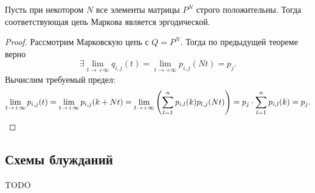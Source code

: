 \begin{corollary}
    Пусть при некотором $N$ все элементы матрицы $P^N$ строго положительны.
    Тогда соответствующая цепь Маркова является эргодической.
\end{corollary}
\begin{proof}
    Рассмотрим Марковскую цепь с $Q = P^N$. Тогда по предыдущей теореме верно
    \[
        \exists \lim_{t \to +\infty}{q_{i, j}(t)} = \lim_{t \to +\infty}
        {p_{i, j}(Nt)} = p_j
    .\]
    Вычислим требуемый предел:
    \[
        \lim_{t \to +\infty}{p_{i, j}(t)} = \lim_{t \to +\infty}
        {p_{i, j}(k + Nt)} = \lim_{t \to +\infty}{\parens*{\sum_{l = 1}^n{
        p_{i, l}(k) p_{l, j}(Nt)}}} = p_j \cdot \sum_{l = 1}^n{p_{i, l}(k)} = p_j
    .\]
\end{proof}

\subsection{Схемы блужданий}
TODO

